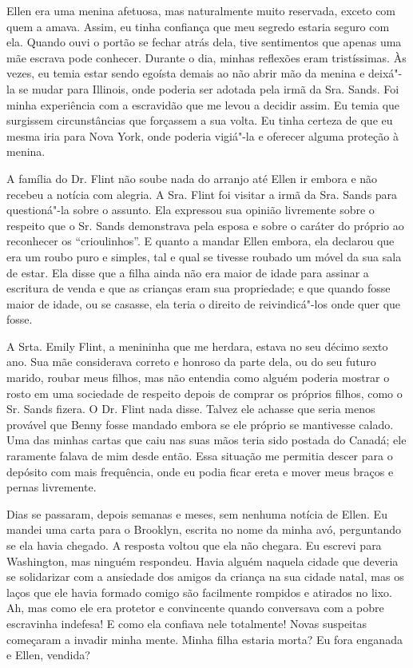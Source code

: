 Ellen era uma menina afetuosa, mas naturalmente muito reservada, exceto
com quem a amava. Assim, eu tinha confiança que meu segredo estaria
seguro com ela. Quando ouvi o portão se fechar atrás dela, tive
sentimentos que apenas uma mãe escrava pode conhecer. Durante o dia,
minhas reflexões eram tristíssimas. Às vezes, eu temia estar sendo
egoísta demais ao não abrir mão da menina e deixá"-la se mudar para
Illinois, onde poderia ser adotada pela irmã da Sra. Sands. Foi minha
experiência com a escravidão que me levou a decidir assim. Eu temia que
surgissem circunstâncias que forçassem a sua volta. Eu tinha certeza de
que eu mesma iria para Nova York, onde poderia vigiá"-la e oferecer
alguma proteção à menina.

A família do Dr. Flint não soube nada
do arranjo até Ellen ir embora e não recebeu a notícia com alegria. A
Sra. Flint foi visitar a irmã da Sra. Sands para questioná"-la sobre o
assunto. Ela expressou sua opinião livremente sobre o respeito que o Sr.
Sands demonstrava pela esposa e sobre o caráter do próprio ao reconhecer
os ``crioulinhos''. E quanto a mandar Ellen embora, ela declarou que era
um roubo puro e simples, tal e qual se tivesse roubado um móvel da sua
sala de estar. Ela disse que a filha ainda não era maior de idade para
assinar a escritura de venda e que as crianças eram sua propriedade; e
que quando fosse maior de idade, ou se casasse, ela teria o direito de
reivindicá"-los onde quer que fosse.

A Srta. Emily Flint, a menininha que me
herdara, estava no seu décimo sexto ano. Sua mãe considerava correto e
honroso da parte dela, ou do seu futuro marido, roubar meus filhos, mas
não entendia como alguém poderia mostrar o rosto em uma sociedade de
respeito depois de comprar os próprios filhos, como o Sr. Sands fizera.
O Dr. Flint nada disse. Talvez ele achasse que seria menos provável que
Benny fosse mandado embora se ele próprio se mantivesse calado. Uma das
minhas cartas que caiu nas suas mãos teria sido postada do Canadá; ele
raramente falava de mim desde então. Essa situação me permitia descer
para o depósito com mais frequência, onde eu podia ficar ereta e mover
meus braços e pernas livremente.

Dias se passaram, depois semanas e
meses, sem nenhuma notícia de Ellen. Eu mandei uma carta para o
Brooklyn, escrita no nome da minha avó, perguntando se ela havia
chegado. A resposta voltou que ela não chegara. Eu escrevi para
Washington, mas ninguém respondeu. Havia alguém naquela cidade que
deveria se solidarizar com a ansiedade dos amigos da criança na sua
cidade natal, mas os laços que ele havia formado comigo são facilmente
rompidos e atirados no lixo. Ah, mas como ele era protetor e convincente
quando conversava com a pobre escravinha indefesa! E como ela confiava
nele totalmente! Novas suspeitas começaram a invadir minha mente. Minha
filha estaria morta? Eu fora enganada e Ellen, vendida?


